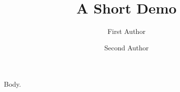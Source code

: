 \documentclass[article]{jss}
\title{A Short Demo}
\author{First Author \and Second Author}
\begin{document}
Body.
\end{document}
